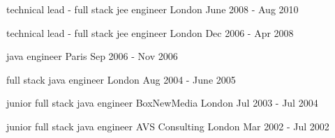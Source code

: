 \begin{cventries}

    \cventry
    {technical lead - full stack jee engineer}
    {}
    {London}
    {June 2008 - Aug 2010}
    {}
    {}

    \cventry
    {technical lead - full stack jee engineer}
    {}
    {London}
    {Dec 2006 - Apr 2008}
    {}
    {}

    \cventry
    {java engineer}
    {}
    {Paris}
    {Sep 2006 - Nov 2006}
    {}
    {}

    \cventry
    {full stack java engineer}
    {}
    {London}
    {Aug 2004 - June 2005}
    {}
    {}

    \cventry
    {junior full stack java engineer}
    {BoxNewMedia}
    {London}
    {Jul 2003 - Jul 2004}
    {}
    {}

    \cventry
    {junior full stack java engineer}
    {AVS Consulting}
    {London}
    {Mar 2002 - Jul 2002} %
    {}
    {}
\end{cventries}
